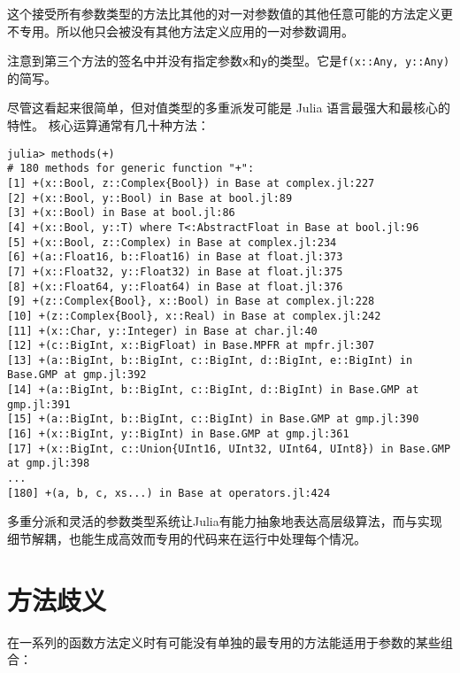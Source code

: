 这个接受所有参数类型的方法比其他的对一对参数值的其他任意可能的方法定义更不专用。所以他只会被没有其他方法定义应用的一对参数调用。



注意到第三个方法的签名中并没有指定参数\texttt{x}和\texttt{y}的类型。它是\texttt{f(x::Any, y::Any)}的简写。



尽管这看起来很简单，但对值类型的多重派发可能是 Julia 语言最强大和最核心的特性。 核心运算通常有几十种方法：




\begin{verbatim}
julia> methods(+)
# 180 methods for generic function "+":
[1] +(x::Bool, z::Complex{Bool}) in Base at complex.jl:227
[2] +(x::Bool, y::Bool) in Base at bool.jl:89
[3] +(x::Bool) in Base at bool.jl:86
[4] +(x::Bool, y::T) where T<:AbstractFloat in Base at bool.jl:96
[5] +(x::Bool, z::Complex) in Base at complex.jl:234
[6] +(a::Float16, b::Float16) in Base at float.jl:373
[7] +(x::Float32, y::Float32) in Base at float.jl:375
[8] +(x::Float64, y::Float64) in Base at float.jl:376
[9] +(z::Complex{Bool}, x::Bool) in Base at complex.jl:228
[10] +(z::Complex{Bool}, x::Real) in Base at complex.jl:242
[11] +(x::Char, y::Integer) in Base at char.jl:40
[12] +(c::BigInt, x::BigFloat) in Base.MPFR at mpfr.jl:307
[13] +(a::BigInt, b::BigInt, c::BigInt, d::BigInt, e::BigInt) in Base.GMP at gmp.jl:392
[14] +(a::BigInt, b::BigInt, c::BigInt, d::BigInt) in Base.GMP at gmp.jl:391
[15] +(a::BigInt, b::BigInt, c::BigInt) in Base.GMP at gmp.jl:390
[16] +(x::BigInt, y::BigInt) in Base.GMP at gmp.jl:361
[17] +(x::BigInt, c::Union{UInt16, UInt32, UInt64, UInt8}) in Base.GMP at gmp.jl:398
...
[180] +(a, b, c, xs...) in Base at operators.jl:424
\end{verbatim}



多重分派和灵活的参数类型系统让Julia有能力抽象地表达高层级算法，而与实现细节解耦，也能生成高效而专用的代码来在运行中处理每个情况。



\hypertarget{8405464025999625028}{}


\section{方法歧义}



在一系列的函数方法定义时有可能没有单独的最专用的方法能适用于参数的某些组合：




